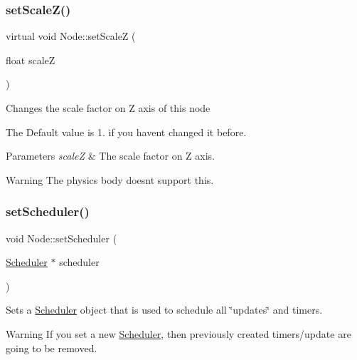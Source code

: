 \subsubsection{\texorpdfstring{set\+Scale\+Z()}{setScaleZ()}\hspace{0.1cm}{\footnotesize\ttfamily [2/2]}}
{\footnotesize\ttfamily virtual void Node\+::set\+ScaleZ (\begin{DoxyParamCaption}\item[{float}]{scaleZ }\end{DoxyParamCaption})\hspace{0.3cm}{\ttfamily [virtual]}}

Changes the scale factor on Z axis of this node

The Default value is 1. if you haven\textquotesingle{}t changed it before.


\begin{DoxyParams}{Parameters}
{\em scaleZ} & The scale factor on Z axis.\\
\hline
\end{DoxyParams}
\begin{DoxyWarning}{Warning}
The physics body doesn\textquotesingle{}t support this. 
\end{DoxyWarning}
\mbox{\label{classNode_a9f0c84dfabdce76b5251725944ae7706}} 
\subsubsection{\texorpdfstring{set\+Scheduler()}{setScheduler()}\hspace{0.1cm}{\footnotesize\ttfamily [1/2]}}
{\footnotesize\ttfamily void Node\+::set\+Scheduler (\begin{DoxyParamCaption}\item[{\hyperlink{classScheduler}{Scheduler} $\ast$}]{scheduler }\end{DoxyParamCaption})\hspace{0.3cm}{\ttfamily [virtual]}}

Sets a \hyperlink{classScheduler}{Scheduler} object that is used to schedule all \char`\"{}updates\char`\"{} and timers.

\begin{DoxyWarning}{Warning}
If you set a new \hyperlink{classScheduler}{Scheduler}, then previously created timers/update are going to be removed. 
\end{DoxyWarning}

